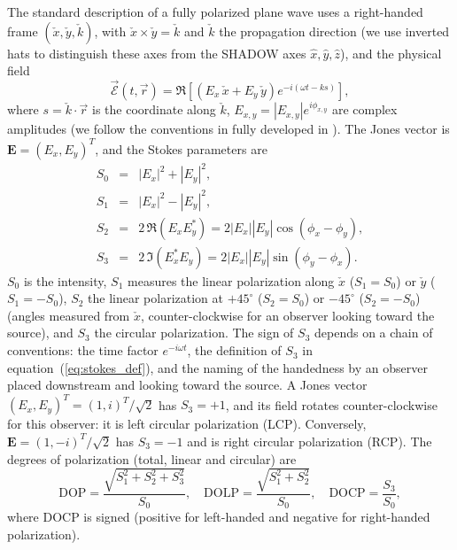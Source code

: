 \documentclass{iucr}
\begin{document}
The standard description of a fully polarized plane wave uses a right-handed frame $(\check{x},\check{y},\check{k})$, with $\check{x}\times\check{y}=\check{k}$ and $\check{k}$ the propagation direction (we use inverted hats to distinguish these axes from the SHADOW axes $\hat{x},\hat{y},\hat{z}$), and the physical field
\begin{equation}\label{eq:physical_wave}
    \vec{\mathcal{E}}(t,\vec{r})
    = \Re\left[\left(E_x\,\check{x} + E_y\,\check{y}\right) e^{-i(\omega t - k s)}\right],
\end{equation}
where $s=\check{k}\cdot\vec{r}$ is the coordinate along $\check{k}$, $E_{x,y}=|E_{x,y}|e^{i\phi_{x,y}}$ are complex amplitudes (we follow the conventions in \cite{Detlefs2012} fully developed in \cite{PolarizationDraft}).
The Jones vector \cite{Jones1941a} is $\mathbf{E}=(E_x, E_y)^T$, and the Stokes parameters \cite{born_wolf} are
\begin{eqnarray}\label{eq:stokes_def}
    S_0 &=& |E_x|^2 + |E_y|^2, \nonumber \\
    S_1 &=& |E_x|^2 - |E_y|^2, \nonumber \\
	S_2 &=& 2\,\Re(E_x E_y^*) = 2 |E_x||E_y| \cos(\phi_x-\phi_y), \nonumber \\
	S_3 &=& 2\,\Im(E_x^* E_y)=2 |E_x||E_y| \sin(\phi_y - \phi_x).
\end{eqnarray}
$S_0$ is the intensity, $S_1$ measures the linear polarization along $\check{x}$ ($S_1=S_0$) or $\check{y}$ ($S_1=-S_0$), $S_2$ the linear polarization at $+45^\circ$ ($S_2=S_0$) or $-45^\circ$ ($S_2=-S_0$) (angles measured from $\check{x}$, counter-clockwise for an observer looking toward the source), and $S_3$ the circular polarization. The sign of $S_3$ depends on a chain of conventions: the time factor $e^{-i\omega t}$, the definition of $S_3$ in equation~(\ref{eq:stokes_def}), and the naming of the handedness by an observer placed downstream and looking toward the source. A Jones vector $(E_x,E_y)^T=(1,i)^T/\sqrt{2}$ has $S_3=+1$, and its field rotates counter-clockwise for this observer: it is left circular polarization (LCP). 
Conversely, $\mathbf{E}=(1,-i)^T/\sqrt{2}$ has $S_3=-1$ and is right circular polarization (RCP).
The degrees of polarization (total, linear and circular) are
\begin{equation}\label{eq:dop}
    \mathrm{DOP} = \frac{\sqrt{S_1^2+S_2^2+S_3^2}}{S_0}, \quad
    \mathrm{DOLP} = \frac{\sqrt{S_1^2+S_2^2}}{S_0}, \quad
    \mathrm{DOCP} = \frac{S_3}{S_0},
\end{equation}
where DOCP is signed (positive for left-handed and negative for right-handed polarization).
\end{document}

